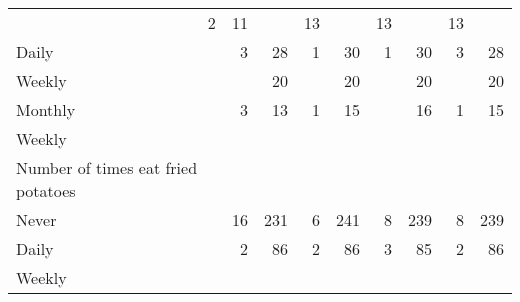 \documentclass{article}
\begin{document}
\begin{tabular}{lllllllll}
  \multicolumn{1}{|r}{2} &
  \multicolumn{1}{r}{11} &
  \multicolumn{1}{r}{} &
  \multicolumn{1}{r}{13} &
  \multicolumn{1}{r}{} &
  \multicolumn{1}{r}{13} &
  \multicolumn{1}{r}{} &
  \multicolumn{1}{r}{13} \\
\multicolumn{1}{l}{\hspace{5em}Daily} &
  \multicolumn{1}{|r}{3} &
  \multicolumn{1}{r}{28} &
  \multicolumn{1}{r}{1} &
  \multicolumn{1}{r}{30} &
  \multicolumn{1}{r}{1} &
  \multicolumn{1}{r}{30} &
  \multicolumn{1}{r}{3} &
  \multicolumn{1}{r}{28} \\
\multicolumn{1}{l}{\hspace{5em}Weekly} &
  \multicolumn{1}{|r}{} &
  \multicolumn{1}{r}{20} &
  \multicolumn{1}{r}{} &
  \multicolumn{1}{r}{20} &
  \multicolumn{1}{r}{} &
  \multicolumn{1}{r}{20} &
  \multicolumn{1}{r}{} &
  \multicolumn{1}{r}{20} \\
\multicolumn{1}{l}{\hspace{5em}Monthly} &
  \multicolumn{1}{|r}{3} &
  \multicolumn{1}{r}{13} &
  \multicolumn{1}{r}{1} &
  \multicolumn{1}{r}{15} &
  \multicolumn{1}{r}{} &
  \multicolumn{1}{r}{16} &
  \multicolumn{1}{r}{1} &
  \multicolumn{1}{r}{15} \\
\multicolumn{1}{l}{\hspace{3em}Weekly} &
  \multicolumn{1}{|r}{} &
  \multicolumn{1}{r}{} &
  \multicolumn{1}{r}{} &
  \multicolumn{1}{r}{} &
  \multicolumn{1}{r}{} &
  \multicolumn{1}{r}{} &
  \multicolumn{1}{r}{} &
  \multicolumn{1}{r}{} \\
\multicolumn{1}{l}{\hspace{4em}Number of times eat fried potatoes} &
  \multicolumn{1}{|r}{} &
  \multicolumn{1}{r}{} &
  \multicolumn{1}{r}{} &
  \multicolumn{1}{r}{} &
  \multicolumn{1}{r}{} &
  \multicolumn{1}{r}{} &
  \multicolumn{1}{r}{} &
  \multicolumn{1}{r}{} \\
\multicolumn{1}{l}{\hspace{5em}Never} &
  \multicolumn{1}{|r}{16} &
  \multicolumn{1}{r}{231} &
  \multicolumn{1}{r}{6} &
  \multicolumn{1}{r}{241} &
  \multicolumn{1}{r}{8} &
  \multicolumn{1}{r}{239} &
  \multicolumn{1}{r}{8} &
  \multicolumn{1}{r}{239} \\
\multicolumn{1}{l}{\hspace{5em}Daily} &
  \multicolumn{1}{|r}{2} &
  \multicolumn{1}{r}{86} &
  \multicolumn{1}{r}{2} &
  \multicolumn{1}{r}{86} &
  \multicolumn{1}{r}{3} &
  \multicolumn{1}{r}{85} &
  \multicolumn{1}{r}{2} &
  \multicolumn{1}{r}{86} \\
\multicolumn{1}{l}{\hspace{5em}Weekly} &

\end{tabular}
\end{document}
